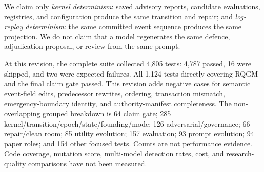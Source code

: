 We claim only \emph{kernel determinism}: saved advisory reports, candidate
evaluations, registries, and configuration produce the same transition and
repair; and \emph{log-replay determinism}: the same committed event sequence
produces the same projection. We do not claim that a model regenerates the
same defence, adjudication proposal, or review from the same prompt.

At this revision, the complete suite collected 4,805 tests: 4,787 passed,
16 were skipped, and two were expected failures. All 1,124 tests directly
covering RQGM and the final claim gate passed. This revision adds negative
cases for semantic event-field edits, predecessor rewrites, ordering,
transaction mismatch, emergency-boundary identity, and authority-manifest
completeness. The non-overlapping grouped breakdown is 64 claim gate; 285
kernel/transition/epoch/state/founding/mode; 126 adversarial/governance;
66 repair/clean room; 85 utility evolution; 157 evaluation; 93 prompt
evolution; 94 paper roles; and 154 other focused tests. Counts are not
performance evidence.
Code coverage, mutation score, multi-model detection rates, cost, and
research-quality comparisons have not been measured.
